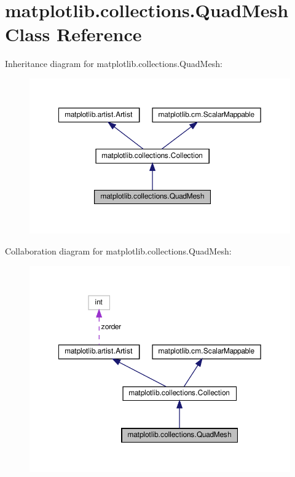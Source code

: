 \hypertarget{classmatplotlib_1_1collections_1_1QuadMesh}{}\section{matplotlib.\+collections.\+Quad\+Mesh Class Reference}
\label{classmatplotlib_1_1collections_1_1QuadMesh}


Inheritance diagram for matplotlib.\+collections.\+Quad\+Mesh\+:
\nopagebreak
\begin{figure}[H]
\begin{center}
\leavevmode
\includegraphics[width=350pt]{classmatplotlib_1_1collections_1_1QuadMesh__inherit__graph}
\end{center}
\end{figure}


Collaboration diagram for matplotlib.\+collections.\+Quad\+Mesh\+:
\nopagebreak
\begin{figure}[H]
\begin{center}
\leavevmode
\includegraphics[width=350pt]{classmatplotlib_1_1collections_1_1QuadMesh__coll__graph}
\end{center}
\end{figure}
